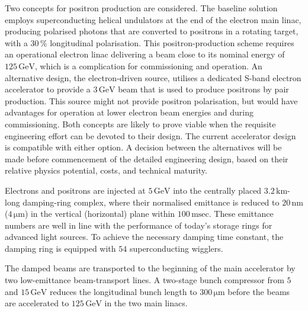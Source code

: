 \documentclass[%
 reprint,
 floatfix,
 amsmath,amssymb,
 aps,
]{revtex4-1}
\begin{document}
Two concepts for positron production are considered.
The baseline solution employs superconducting helical undulators at
the end of the electron main linac, producing polarised photons that
are converted to positrons
in a rotating target, with a $30\,\%$
 longitudinal polarisation. 
This positron-production scheme requires an operational electron linac
delivering a beam close to its nominal energy of
$125\,{\mathrm{GeV}}$, 
which is a complication for commissioning and operation. 
An alternative design, the electron-driven source, utilises a dedicated S-band electron accelerator to provide a $3\,{\mathrm{GeV}}$ beam that is used to produce positrons by pair production.
This source might not provide positron polarisation,
but would have advantages for operation at lower electron beam energies and during commissioning.
Both concepts are
likely to prove viable when the requisite engineering effort can be devoted to their design.
The current accelerator design is compatible with either option. 
A decision between the alternatives will be made before commencement of the detailed engineering design, based on their relative physics potential, costs, and technical maturity.

Electrons and positrons are injected at $5\,{\mathrm{GeV}}$ into the
centrally placed $3.2\,{\mathrm{km}}$-long damping-ring complex, where
their normalised emittance is reduced to $20\,{\mathrm{nm}}$
($4\,{\mathrm{\mu m}}$) 
in the vertical (horizontal) plane within $100\,{\mathrm{msec}}$. 
These emittance numbers are well in line with 
the performance of today's storage rings for advanced light sources.
To achieve the necessary damping time constant,
 the damping ring is equipped with $54$ superconducting wigglers. 

The damped beams are transported to the beginning of the main
accelerator by two low-emittance beam-transport lines. A two-stage
bunch compressor from $5$ and $15\,{\mathrm{GeV}}$ reduces the
longitudinal bunch length to $300\,{\mathrm{\mu m}}$ before the beams
are accelerated to $125\,{\mathrm{GeV}}$
 in the two main linacs.
\end{document}
